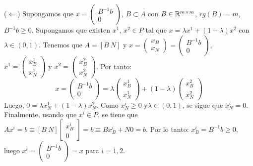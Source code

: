 \documentclass[PM.tex]{subfiles}
\begin{document}
\begin{dem}
($\Leftarrow$) Supongamos que $x =\begin{pmatrix} B^{-1}b\\0\end{pmatrix}$, $B \subset A$ con $B \in \mathbb{R}^{m \times m}$, $rg(B)=m$, $B^{-1}b ≥ 0$. Supongamos que existen $x^1$, $x^2 \in P$ tal que $x = λx^1+(1-λ)x^2$ con $λ \in (0,1)$. Tenemos que $A = [B\ N]$ y $x = \begin{pmatrix}x_B\\x_N\end{pmatrix} = \begin{pmatrix} B^{-1}b\\0\end{pmatrix}$, $x^1 = \begin{pmatrix}x_B^1\\x_N^1\end{pmatrix}$ y $x^2 = \begin{pmatrix}x_B^2\\x_N^2\end{pmatrix}$. Por tanto:
\[ x = \begin{pmatrix} B^{-1}b\\0\end{pmatrix} = λ\begin{pmatrix}x_B^1\\x_N^1\end{pmatrix}+(1-λ)\begin{pmatrix}x_B^2\\x_N^2\end{pmatrix} \]
Luego, $0 = λ x_N^1 + (1-λ) x_N^2$. Como $x_N^i ≥ 0$ y$\lambda\in(0,1)$, se sigue que $x_N^i = 0$. Finalmente, usando que $x^i \in P$, se tiene que $Ax^i = b \equiv [B\ N]\begin{bmatrix}x_B^i\\0
\end{bmatrix} = b \equiv Bx_B^i + N0 = b$. Por lo tanto: $x_B^i = B^{-1}b \geq 0$, luego $x^i = \begin{pmatrix}B^{-1}b\\0\end{pmatrix}=x$ para $i=1,2$.



\end{dem}
\end{document}
